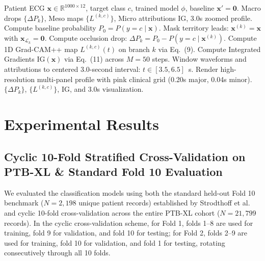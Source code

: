 \documentclass[12pt]{elsarticle}
\begin{document}
\begin{algorithm}[t]
\caption{Multi-Scale Anatomical Attribution Inference}
\label{alg:xai_inference}
\begin{algorithmic}[1]
\REQUIRE Patient ECG $\mathbf{x} \in \mathbb{R}^{1000 \times 12}$, target class $c$, trained model $\phi$, baseline $\mathbf{x}' = \mathbf{0}$.
\ENSURE Macro drops $\{\Delta P_k\}$, Meso maps $\{L^{(k, c)}\}$, Micro attributions $\text{IG}$, 3.0s zoomed profile.
\STATE Compute baseline probability $P_0 = P(y = c \mid \mathbf{x})$.
    \STATE Mask territory leads: $\mathbf{x}^{(k)} = \mathbf{x}$ with $\mathbf{x}_{\mathcal{L}_k} = \mathbf{0}$.
    \STATE Compute occlusion drop: $\Delta P_k = P_0 - P(y = c \mid \mathbf{x}^{(k)})$.
    \STATE Compute 1D Grad-CAM++ map $L^{(k, c)}(t)$ on branch $k$ via Eq.~(9).
\ENDFOR
\STATE Compute Integrated Gradients $\text{IG}(\mathbf{x})$ via Eq.~(11) across $M=50$ steps.
\STATE Window waveforms and attributions to centered 3.0-second interval: $t \in [3.5, 6.5]$~s.
\STATE Render high-resolution multi-panel profile with pink clinical grid (0.20s major, 0.04s minor).
\RETURN $\{\Delta P_k\}$, $\{L^{(k, c)}\}$, $\text{IG}$, and 3.0s visualization.
\end{algorithmic}
\end{algorithm}


\section{Experimental Results}
\label{sec:results}

\subsection{Cyclic 10-Fold Stratified Cross-Validation on PTB-XL \& Standard Fold 10 Evaluation}
\label{sec:10fold_results}
We evaluated the classification models using both the standard held-out Fold 10 benchmark ($N = 2,198$ unique patient records) established by Strodthoff et al.~\cite{strodthoff2020deep} and cyclic 10-fold cross-validation across the entire PTB-XL cohort ($N = 21,799$ records). In the cyclic cross-validation scheme, for Fold 1, folds 1--8 are used for training, fold 9 for validation, and fold 10 for testing; for Fold 2, folds 2--9 are used for training, fold 10 for validation, and fold 1 for testing, rotating consecutively through all 10 folds.
\end{document}
